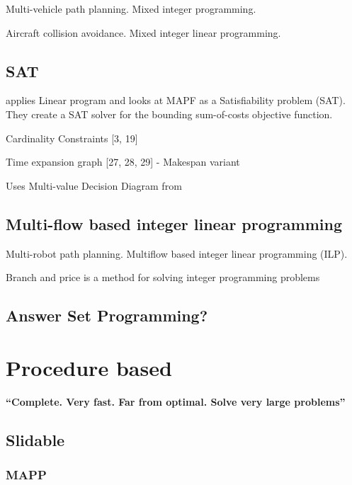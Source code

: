 \documentclass[a4paper,11pt]{article}
\begin{document}
\cite{schouwenaars2001mixed} Multi-vehicle path planning. Mixed integer programming.

\cite{richards2002aircraft} Aircraft collision avoidance. Mixed integer linear programming.

\subsection{SAT}
\cite{surynek2016efficient} applies Linear program and looks at MAPF as a Satisfiability problem (SAT). They create a SAT solver for the bounding sum-of-costs objective function.


\begin{compactitem}
	\item Cardinality Constraints [3, 19]
	\item Time expansion graph [27, 28, 29] - Makespan variant
	\item Uses Multi-value Decision Diagram from \cite{sharon2011increasing}
\end{compactitem}


\subsection{Multi-flow based integer linear programming}

\cite{yu2013planning} Multi-robot path planning. Multiflow based integer linear programming (ILP).

Branch and price is a method for solving integer programming problems





\subsection{Answer Set Programming?}

\section{Procedure based}

\textbf{``Complete. Very fast. Far from optimal. Solve very large problems''}

\subsection{Slidable}
\subsubsection*{MAPP}
\cite{wang2011mapp}
\end{document}
